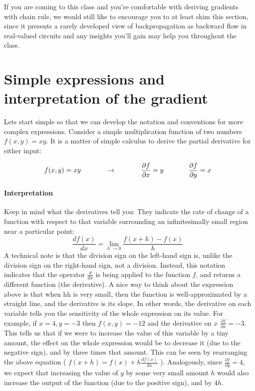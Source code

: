 If you are coming to this class and you’re comfortable with deriving gradients with chain rule, we would still like to encourage you to at least skim this section, since it presents a rarely developed view of backpropagation as backward flow in real-valued circuits and any insights you’ll gain may help you throughout the class.


\section*{Simple expressions and interpretation of the gradient}

Lets start simple so that we can develop the notation and conventions for more complex expressions. Consider a simple multiplication function of two numbers $f(x,y)=xy$. It is a matter of simple calculus to derive the partial derivative for either input:

\begin{equation}
f(x,y) = x y \hspace{0.5in} \rightarrow \hspace{0.5in} \frac{\partial f}{\partial x} = y \hspace{0.5in} \frac{\partial f}{\partial y} = x
\end{equation}

\paragraph*{Interpretation} Keep in mind what the derivatives tell you: They indicate the rate of change of a function with respect to that variable surrounding an infinitesimally small region near a particular point:
\begin{equation}
\frac{df(x)}{dx} = \lim_{h\ \to 0} \frac{f(x + h) - f(x)}{h}
\end{equation}
A technical note is that the division sign on the left-hand sign is, unlike the division sign on the right-hand sign, not a division. Instead, this notation indicates that the operator $\frac{d}{dx}$ is being applied to the function $f$, and returns a different function (the derivative). A nice way to think about the expression above is that when hh is very small, then the function is well-approximated by a straight line, and the derivative is its slope. In other words, the derivative on each variable tells you the sensitivity of the whole expression on its value. For example, if $x=4,y=−3$ then $f(x,y)=−12$ and the derivative on $x$ $\frac{\partial f}{\partial x} = -3$. This tells us that if we were to increase the value of this variable by a tiny amount, the effect on the whole expression would be to decrease it (due to the negative sign), and by three times that amount. This can be seen by rearranging the above equation ( $f(x + h) = f(x) + h \frac{df(x)}{dx}$ ). Analogously, since $\frac{\partial f}{\partial y} = 4$, we expect that increasing the value of $y$ by some very small amount $h$ would also increase the output of the function (due to the positive sign), and by $4h$.

